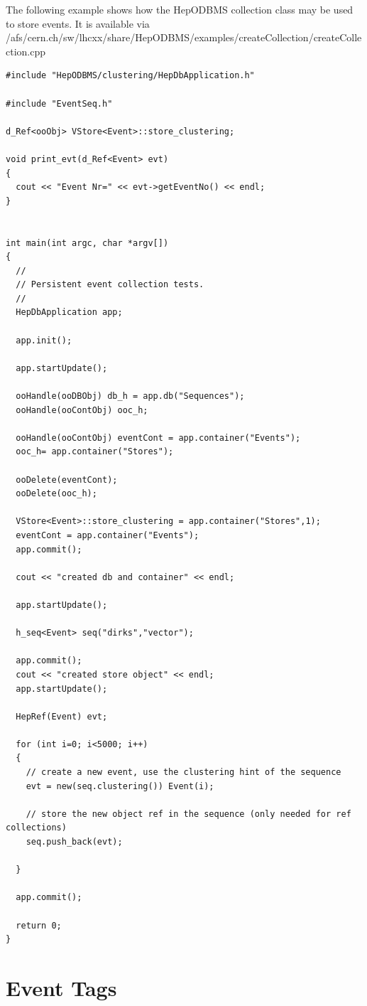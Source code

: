 \par

The following example shows how the HepODBMS collection
class may be used to store events. It is available
via  /afs/cern.ch/sw/lhcxx/share/HepODBMS/examples/createCollection/createCollection.cpp 

\begin{verbatim}
#include "HepODBMS/clustering/HepDbApplication.h" 

#include "EventSeq.h" 

d_Ref<ooObj> VStore<Event>::store_clustering; 

void print_evt(d_Ref<Event> evt) 
{ 
  cout << "Event Nr=" << evt->getEventNo() << endl; 
} 
  

int main(int argc, char *argv[]) 
{ 
  // 
  // Persistent event collection tests. 
  // 
  HepDbApplication app; 
  
  app.init(); 
  
  app.startUpdate(); 

  ooHandle(ooDBObj) db_h = app.db("Sequences"); 
  ooHandle(ooContObj) ooc_h; 
  
  ooHandle(ooContObj) eventCont = app.container("Events"); 
  ooc_h= app.container("Stores"); 

  ooDelete(eventCont); 
  ooDelete(ooc_h); 

  VStore<Event>::store_clustering = app.container("Stores",1); 
  eventCont = app.container("Events"); 
  app.commit(); 

  cout << "created db and container" << endl; 

  app.startUpdate(); 
  
  h_seq<Event> seq("dirks","vector"); 

  app.commit(); 
  cout << "created store object" << endl; 
  app.startUpdate(); 

  HepRef(Event) evt; 

  for (int i=0; i<5000; i++) 
  { 
    // create a new event, use the clustering hint of the sequence 
    evt = new(seq.clustering()) Event(i); 
  
    // store the new object ref in the sequence (only needed for ref collections) 
    seq.push_back(evt); 

  } 

  app.commit(); 

  return 0; 
}
\end{verbatim}
\section{Event Tags}

